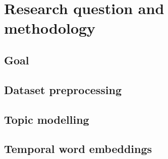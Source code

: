 \section{Research question and methodology}
\subsection{Goal}

\subsection{Dataset preprocessing}

\subsection{Topic modelling}

\subsection{Temporal word embeddings}
